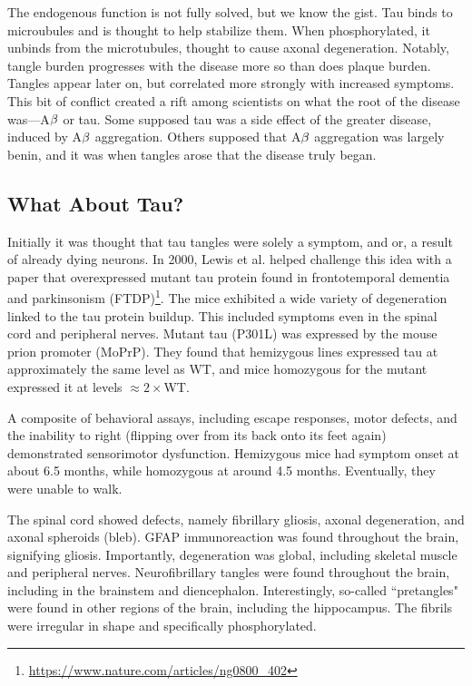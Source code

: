  The endogenous function is not fully solved, but we know the gist. Tau binds to microubules and is thought to help stabilize them. When phosphorylated, it unbinds from the microtubules, thought to cause axonal degeneration. Notably, tangle burden progresses with the disease more so than does plaque burden. Tangles appear later on, but correlated more strongly with increased symptoms. This bit of conflict created a rift among scientists on what the root of the disease was---A$\beta$ or tau. Some supposed tau was a side effect of the greater disease, induced by A$\beta$ aggregation. Others supposed that A$\beta$ aggregation was largely benin, and it was when tangles arose that the disease truly began. 

 \subsection*{What About Tau?}

 Initially it was thought that tau tangles were solely a symptom, and or, a result of already dying neurons. In 2000, Lewis et al. helped challenge this idea with a paper that overexpressed mutant tau protein found in frontotemporal dementia and parkinsonism (FTDP)\footnote{\url{https://www.nature.com/articles/ng0800_402}}. The mice exhibited a wide variety of degeneration linked to the tau protein buildup. This included symptoms even in the spinal cord and peripheral nerves. Mutant tau (P301L) was expressed by the mouse prion promoter (MoPrP). They found that hemizygous lines expressed tau at approximately the same level as WT, and mice homozygous for the mutant expressed it at levels $\approx 2\times$WT.\newline

 A composite of behavioral assays, including escape responses, motor defects, and the inability to right (flipping over from its back onto its feet again) demonstrated sensorimotor dysfunction. Hemizygous mice had symptom onset at about 6.5 months, while homozygous at around 4.5 months. Eventually, they were unable to walk. \newline

The spinal cord showed defects, namely fibrillary gliosis, axonal degeneration, and axonal spheroids (bleb). GFAP immunoreaction was found throughout the brain, signifying gliosis. Importantly, degeneration was global, including skeletal muscle and peripheral nerves. Neurofibrillary tangles were found throughout the brain, including in the brainstem and diencephalon. Interestingly, so-called ``pretangles" were found in other regions of the brain, including the hippocampus. The fibrils were irregular in shape and specifically phosphorylated.\newline

